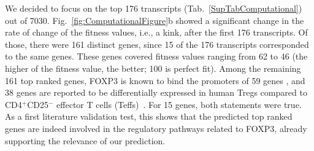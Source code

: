 \documentclass[oneside, 10pt, a4paper, twocolumn]{article}
\begin{document}

We decided to focus on the top 176 transcripts (Tab.~\ref{SupTabComputational}) 
out of 7030. 
Fig.~\ref{fig:ComputationalFigure}b showed a significant change in the rate of change of the fitness values, i.e., a kink, after the first 176 transcripts. 
Of those, there were 161 distinct genes, since 15 of the 176 transcripts 
corresponded to the same genes. These genes covered fitness values ranging from 62 to 46 (the higher of the fitness value, the better; 100 is perfect fit). 
Among the remaining 161 top ranked genes, FOXP3 is known to bind the promoters of 59 genes \citep{Sadlon2010}, and 38 genes are reported to be differentially expressed in human Tregs compared to CD4$^{+}$CD25$^{-}$ effector T cells (Teffs)~\citep{Sadlon2010}. For 15 genes, both statements were true. 
As a first literature validation test, this shows that the predicted top ranked genes are indeed involved in the regulatory pathways related to FOXP3, already supporting the relevance of our prediction.
\end{document}
